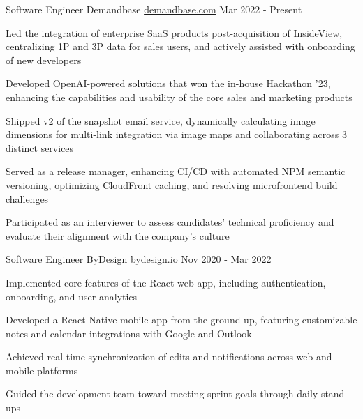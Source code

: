 

\begin{cventries}

\cventry
{Software Engineer} %
{Demandbase} %
{\href{https://www.demandbase.com/}{demandbase.com}} %
{Mar 2022 - Present} %
{
  \begin{cvitems} %
    \item {Led the integration of enterprise SaaS products post-acquisition of InsideView, centralizing 1P and 3P data for sales users, and actively assisted with onboarding of new developers}
    \item {Developed OpenAI-powered solutions that won the in-house Hackathon '23, enhancing the capabilities and usability of the core sales and marketing products}
    \item {Shipped v2 of the snapshot email service, dynamically calculating image dimensions for multi-link integration via image maps and collaborating across 3 distinct services}
    \item {Served as a release manager, enhancing CI/CD with automated NPM semantic versioning, optimizing CloudFront caching, and resolving microfrontend build challenges}
    \item {Participated as an interviewer to assess candidates' technical proficiency and evaluate their alignment with the company's culture}
  \end{cvitems}
}

\cventry
{Software Engineer} %
{ByDesign} %
{\href{https://bydesign.io}{bydesign.io}} %
{Nov 2020 - Mar 2022} %
{
  \begin{cvitems} %
    \item {Implemented core features of the React web app, including authentication, onboarding, and user analytics}
    \item {Developed a React Native mobile app from the ground up, featuring customizable notes and calendar integrations with Google and Outlook}
    \item {Achieved real-time synchronization of edits and notifications across web and mobile platforms}
    \item {Guided the development team toward meeting sprint goals through daily stand-ups}
  \end{cvitems}
}


\end{cventries}
